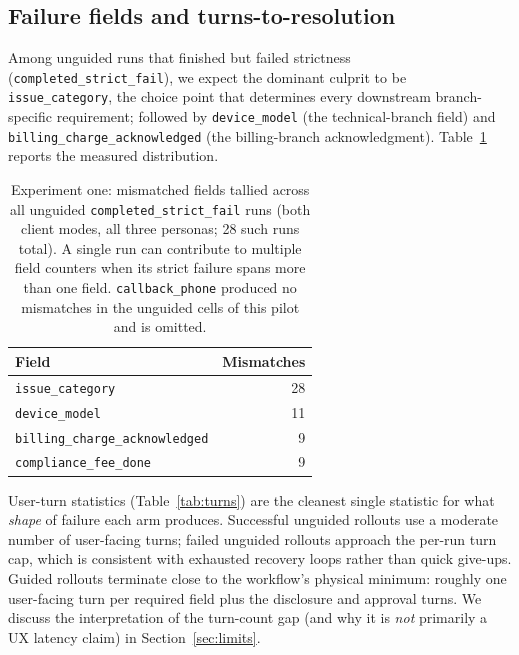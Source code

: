 \documentclass[11pt,a4paper]{article}
\begin{document}
\subsection{Failure fields and turns-to-resolution}

Among unguided runs that finished but failed strictness (\texttt{completed\_strict\_fail}), we expect the dominant culprit to be \texttt{issue\_category}, the choice point that determines every downstream branch-specific requirement; followed by \texttt{device\_model} (the technical-branch field) and \texttt{billing\_charge\_acknowledged} (the billing-branch acknowledgment). Table~\ref{tab:failures} reports the measured distribution.

\begin{table}[htbp]
  \centering
  \caption{Experiment one: mismatched fields tallied across all unguided \texttt{completed\_strict\_fail} runs (both client modes, all three personas; 28 such runs total). A single run can contribute to multiple field counters when its strict failure spans more than one field. \texttt{callback\_phone} produced no mismatches in the unguided cells of this pilot and is omitted.}
  \label{tab:failures}
  \begin{tabular}{lr}
    \toprule
    Field & Mismatches \\
    \midrule
    \texttt{issue\_category}              & 28 \\
    \texttt{device\_model}                & 11 \\
    \texttt{billing\_charge\_acknowledged}&  9 \\
    \texttt{compliance\_fee\_done}        &  9 \\
    \bottomrule
  \end{tabular}
\end{table}

User-turn statistics (Table~\ref{tab:turns}) are the cleanest single statistic for what \emph{shape} of failure each arm produces. Successful unguided rollouts use a moderate number of user-facing turns; failed unguided rollouts approach the per-run turn cap, which is consistent with exhausted recovery loops rather than quick give-ups. Guided rollouts terminate close to the workflow's physical minimum: roughly one user-facing turn per required field plus the disclosure and approval turns. We discuss the interpretation of the turn-count gap (and why it is \emph{not} primarily a UX latency claim) in Section~\ref{sec:limits}.
\end{document}
